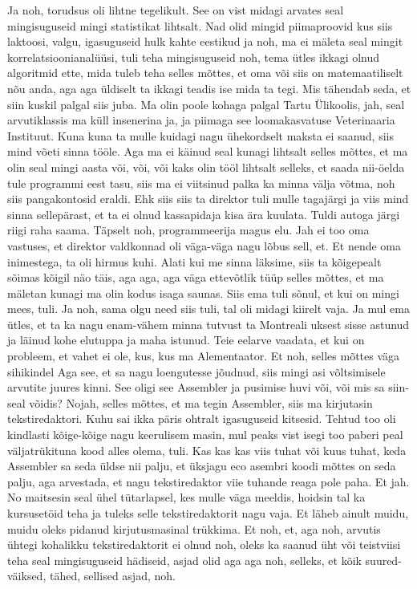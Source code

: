 Ja noh, torudsus oli lihtne tegelikult.
See on vist midagi arvates seal mingisuguseid mingi statistikat lihtsalt.
Nad olid mingid piimaproovid kus siis laktoosi, valgu, igasuguseid hulk kahte eestikud ja noh, ma ei mäleta seal mingit korrelatsioonianalüüsi, tuli teha mingisuguseid noh, tema ütles ikkagi olnud algoritmid ette, mida tuleb teha selles mõttes, et oma või siis on matemaatiliselt nõu anda, aga aga üldiselt ta ikkagi teadis ise mida ta tegi. Mis tähendab seda, et siin kuskil palgal siis juba.
Ma olin poole kohaga palgal Tartu Ülikoolis, jah, seal arvutiklassis ma küll insenerina ja, ja piimaga see loomakasvatuse Veterinaaria Instituut. Kuna kuna ta mulle kuidagi nagu ühekordselt maksta ei saanud, siis mind võeti sinna tööle. Aga ma ei käinud seal kunagi lihtsalt selles mõttes, et ma olin seal mingi aasta või, või, või kaks olin tööl lihtsalt selleks, et saada nii-öelda tule programmi eest tasu, siis ma ei viitsinud palka ka minna välja võtma, noh siis pangakontosid eraldi. Ehk siis siis ta direktor tuli mulle tagajärgi ja viis mind sinna sellepärast, et ta ei olnud kassapidaja kisa ära kuulata.
Tuldi autoga järgi riigi raha saama. Täpselt noh, programmeerija magus elu.
Jah ei too oma vastuses, et direktor valdkonnad oli väga-väga nagu lõbus sell, et.
Et nende oma inimestega, ta oli hirmus kuhi. Alati kui me sinna läksime, siis ta kõigepealt sõimas kõigil näo täis, aga aga, aga väga ettevõtlik tüüp selles mõttes, et ma mäletan kunagi ma olin kodus isaga saunas. Siis ema tuli sõnul, et kui on mingi mees, tuli. Ja noh, sama olgu need siis tuli, tal oli midagi kiirelt vaja. Ja mul ema ütles, et ta ka nagu enam-vähem minna tutvust ta Montreali uksest sisse astunud ja läinud kohe elutuppa ja maha istunud. Teie eelarve vaadata, et kui on probleem, et vahet ei ole, kus, kus ma Alementaator.
Et noh, selles mõttes väga sihikindel
Aga see, et sa nagu loengutesse jõudnud, siis mingi asi võltsimisele arvutite juures kinni. See oligi see Assembler ja pusimise huvi või, või mis sa siin-seal võidis?
Nojah, selles mõttes, et ma tegin Assembler, siis ma kirjutasin tekstiredaktori.
Kuhu sai ikka päris ohtralt igasuguseid kitsesid. Tehtud too oli kindlasti kõige-kõige nagu keerulisem masin, mul peaks vist isegi too paberi peal väljatrükituna kood alles olema, tuli.
Kas kas kas viis tuhat või kuus tuhat, keda Assembler sa seda üldse nii palju, et üksjagu eco asembri koodi mõttes on seda palju, aga arvestada, et nagu tekstiredaktor viie tuhande reaga pole paha.
Et jah.
No maitsesin seal ühel tütarlapsel, kes mulle väga meeldis, hoidsin tal ka kursusetöid teha ja tuleks selle tekstiredaktorit nagu vaja. Et läheb ainult muidu, muidu oleks pidanud kirjutusmasinal trükkima. Et noh, et, aga noh, arvutis ühtegi kohalikku tekstiredaktorit ei olnud noh, oleks ka saanud üht või teistviisi teha seal mingisuguseid hädiseid, asjad olid aga aga noh, selleks, et kõik suured-väiksed, tähed, sellised asjad, noh.
